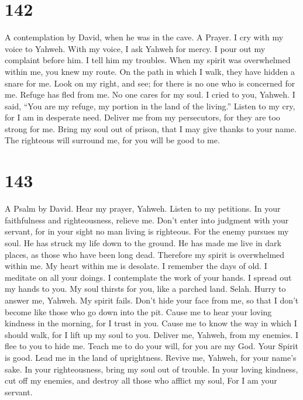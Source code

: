 \hypertarget{section-134}{%
\section{142}\label{section-134}}

A contemplation by David, when he was in the cave. A Prayer.
 I cry with my voice to Yahweh. With my voice, I ask
Yahweh for mercy.  I pour out my complaint before him. I
tell him my troubles.  When my spirit was overwhelmed
within me, you knew my route. On the path in which I walk, they have
hidden a snare for me.  Look on my right, and see; for
there is no one who is concerned for me. Refuge has fled from me. No one
cares for my soul.  I cried to you, Yahweh. I said, ``You
are my refuge, my portion in the land of the living.'' 
Listen to my cry, for I am in desperate need. Deliver me from my
persecutors, for they are too strong for me.  Bring my
soul out of prison, that I may give thanks to your name. The righteous
will surround me, for you will be good to me.

\hypertarget{section-135}{%
\section{143}\label{section-135}}

A Psalm by David.  Hear my prayer, Yahweh. Listen to my
petitions. In your faithfulness and righteousness, relieve me.
 Don't enter into judgment with your servant, for in your
sight no man living is righteous.  For the enemy pursues
my soul. He has struck my life down to the ground. He has made me live
in dark places, as those who have been long dead. 
Therefore my spirit is overwhelmed within me. My heart within me is
desolate.  I remember the days of old. I meditate on all
your doings. I contemplate the work of your hands.  I
spread out my hands to you. My soul thirsts for you, like a parched
land. Selah.  Hurry to answer me, Yahweh. My spirit fails.
Don't hide your face from me, so that I don't become like those who go
down into the pit.  Cause me to hear your loving kindness
in the morning, for I trust in you. Cause me to know the way in which I
should walk, for I lift up my soul to you.  Deliver me,
Yahweh, from my enemies. I flee to you to hide me.  Teach
me to do your will, for you are my God. Your Spirit is good. Lead me in
the land of uprightness.  Revive me, Yahweh, for your
name's sake. In your righteousness, bring my soul out of trouble.
 In your loving kindness, cut off my enemies, and destroy
all those who afflict my soul, For I am your servant.

